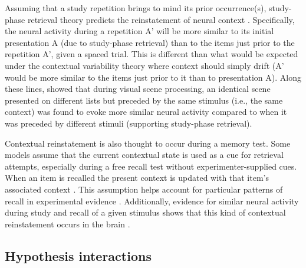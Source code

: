 Assuming that a study repetition brings to mind its prior occurrence(s), study-phase retrieval theory predicts the reinstatement of neural context \cite{LohnKaha2014b}.  Specifically, the neural activity during a repetition A' will be more similar to its initial presentation A (due to study-phase retrieval) than to the items just prior to the repetition A', given a spaced trial.  This is different than what would be expected under the contextual variability theory where context should simply drift (A' would be more similar to the items just prior to it than to presentation A).  Along these lines,  showed that during visual scene processing, an identical scene presented on different lists but preceded by the same stimulus (i.e., the same context) was found to evoke more similar neural activity compared to when it was preceded by different stimuli (supporting study-phase retrieval).


Contextual reinstatement is also thought to occur during a memory test.  Some models assume that the current contextual state is used as a cue for retrieval attempts, especially during a free recall test without experimenter-supplied cues.  When an item is recalled the present context is updated with that item's associated context \cite{HowaKaha2002,SedeEtal2008}. This assumption helps account for particular patterns of recall in experimental evidence \cite{Kaha1996,LohnKaha2014b}.
Additionally, evidence for similar neural activity during study and recall of a given stimulus shows that this kind of contextual reinstatement occurs in the brain \cite{MannEtal2011,PolyKaha2008,XueEtal2010}.


\subsection{Hypothesis interactions}

